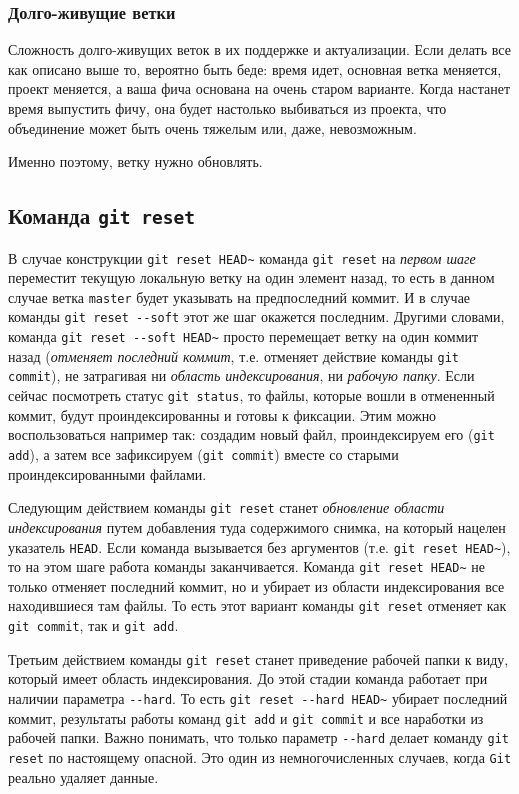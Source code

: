 \documentclass[%
	11pt,
	a4paper,
	utf8,
		]{article}
\begin{document}
\subsubsection{Долго-живущие ветки}

Сложность долго-живущих веток в их поддержке и актуализации. Если делать все как описано выше то, вероятно быть беде: время идет, основная ветка меняется, проект меняется, а ваша фича основана на очень старом варианте. Когда настанет время выпустить фичу, она будет настолько выбиваться из проекта, что объединение может быть очень тяжелым или, даже, невозможным.

Именно поэтому, ветку нужно обновлять.


\subsection{Команда \texttt{git reset}}

В случае конструкции \texttt{git reset HEAD\~} команда \texttt{git reset} на \emph{первом шаге} переместит текущую локальную ветку на один элемент назад, то есть в данном случае ветка \texttt{master} будет указывать на предпоследний коммит. И в случае команды \verb|git reset --soft| этот же шаг окажется последним. Другими словами, команда \verb|git reset --soft HEAD~| просто перемещает ветку на один коммит назад (\emph{отменяет последний коммит}, т.е. отменяет действие команды \texttt{git commit}), не затрагивая ни \emph{область индексирования}, ни \emph{рабочую папку}. Если сейчас посмотреть статус \texttt{git status}, то файлы, которые вошли в отмененный коммит, будут проиндексированны и готовы к фиксации. Этим можно воспользоваться например так: создадим новый файл, проиндексируем его (\texttt{git add}), а затем все зафиксируем (\texttt{git commit}) вместе со старыми проиндексированными файлами.

Следующим действием команды \texttt{git reset} станет \emph{обновление области индексирования} путем добавления туда содержимого снимка, на который нацелен указатель \texttt{HEAD}. Если команда вызывается без аргументов (т.е. \texttt{git reset HEAD\~}), то на этом шаге работа команды заканчивается. Команда \texttt{git reset HEAD\~} не только отменяет последний коммит, но и убирает из области индексирования все находившиеся там файлы. То есть этот вариант команды \texttt{git reset} отменяет как \texttt{git commit}, так и \texttt{git add}.

Третьим действием команды \texttt{git reset} станет приведение рабочей папки к виду, который имеет область индексирования. До этой стадии команда работает при наличии параметра \verb|--hard|. То есть \verb|git reset --hard HEAD~| убирает последний коммит, результаты работы команд \texttt{git add} и \texttt{git commit} и все наработки из рабочей папки. Важно понимать, что только параметр \verb|--hard| делает команду \texttt{git reset} по настоящему опасной. Это один из немногочисленных случаев, когда \texttt{Git} реально удаляет данные. 
\end{document}
